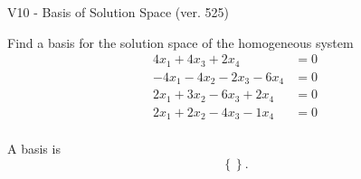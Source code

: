 \begin{exercise}
  \begin{exerciseTitle}V10 - Basis of Solution Space (ver. 525)\end{exerciseTitle}
  \begin{exerciseStatement}
    Find a basis for the solution space of the homogeneous system 
\begin{align*}
 4 x_ 1 + 4 x_ 3 + 2 x_ 4 &= 0  \\ 
  -4 x_ 1 -4 x_ 2 -2 x_ 3 -6 x_ 4 &= 0  \\ 
  2 x_ 1 + 3 x_ 2 -6 x_ 3 + 2 x_ 4 &= 0  \\ 
  2 x_ 1 + 2 x_ 2 -4 x_ 3 -1 x_ 4 &= 0  \\ 
 \end{align*}


 
  \end{exerciseStatement}

  \begin{exerciseAnswer}
   A basis is   
\[\left\{\right\}.\]

  


  \end{exerciseAnswer}
\end{exercise}